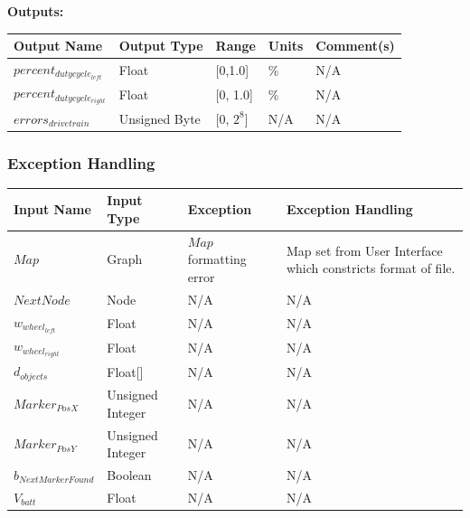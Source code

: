 \documentclass [10pt]{article}
\begin{document}
\textbf{Outputs: } \\
\begin{longtable}{|l|l|l|l|l|}\hline 
	\rowcolor{tableCell}\textbf{Output Name} & \textbf{Output Type} & \textbf{Range} & \textbf{Units} & \textbf{Comment(s)} \\ \hline
	$ percent_{dutycycle_{left}} $ & Float & [0,1.0] & \% &  N/A\\ \hline
	\rowcolor{tableCell}$ percent_{dutycycle_{right}} $ & Float & [0, 1.0]& \% & N/A\\ \hline
	$ errors_{drivetrain} $ & Unsigned Byte & [0, $2^{8}$]& N/A & N/A\\ \hline
\end{longtable}


\subsubsection{Exception Handling}

\begin{longtable}{| p{} | p{} | p{} | p{} |}\hline 
	\rowcolor{tableCell}\textbf{Input Name} & \textbf{Input Type} & \textbf{Exception} & \textbf{Exception Handling} \\ \hline
	$ Map $ & Graph & $ Map $ formatting error & Map set from User Interface which constricts format of file. \\ \hline
	\rowcolor{tableCell}$ NextNode $ & Node & N/A & N/A \\ \hline
	$ w_{wheel_{left}} $ & Float & N/A & N/A \\ \hline
	\rowcolor{tableCell}$ w_{wheel_{right}} $ & Float & N/A & N/A \\ \hline
	$  d_{objects} $ & Float[] & N/A & N/A \\ \hline
	\rowcolor{tableCell}$ Marker_{PosX} $ & Unsigned Integer & N/A & N/A\\ \hline
	$ Marker_{PosY} $ & Unsigned Integer & N/A & N/A \\ \hline
	\rowcolor{tableCell}$ b_{NextMarkerFound} $ & Boolean & N/A & N/A \\ \hline
	$  V_{batt} $ & Float & N/A &  N/A\\ \hline
\end{longtable}

\end{document}

